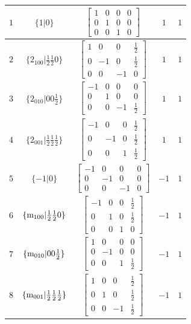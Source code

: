 \documentclass[fleqn,8pt]{jsarticle}
\begin{document}
\begin{longtable}{ccccc}
$ 1 $ & $ \{1|0\} $ & $ \begin{bmatrix} 1 & 0 & 0 & 0 \\ 0 & 1 & 0 & 0 \\ 0 & 0 & 1 & 0 \end{bmatrix} $ & $ 1 $ & $ 1 $ \\ \hline
$ 2 $ & $ \{2{}_{100}|\frac{1}{2} \frac{1}{2} 0\} $ & $ \begin{bmatrix} 1 & 0 & 0 & \frac{1}{2} \\ 0 & -1 & 0 & \frac{1}{2} \\ 0 & 0 & -1 & 0 \end{bmatrix} $ & $ 1 $ & $ 1 $ \\ \hline
$ 3 $ & $ \{2{}_{010}|0 0 \frac{1}{2}\} $ & $ \begin{bmatrix} -1 & 0 & 0 & 0 \\ 0 & 1 & 0 & 0 \\ 0 & 0 & -1 & \frac{1}{2} \end{bmatrix} $ & $ 1 $ & $ 1 $ \\ \hline
$ 4 $ & $ \{2{}_{001}|\frac{1}{2} \frac{1}{2} \frac{1}{2}\} $ & $ \begin{bmatrix} -1 & 0 & 0 & \frac{1}{2} \\ 0 & -1 & 0 & \frac{1}{2} \\ 0 & 0 & 1 & \frac{1}{2} \end{bmatrix} $ & $ 1 $ & $ 1 $ \\ \hline
$ 5 $ & $ \{-1|0\} $ & $ \begin{bmatrix} -1 & 0 & 0 & 0 \\ 0 & -1 & 0 & 0 \\ 0 & 0 & -1 & 0 \end{bmatrix} $ & $ -1 $ & $ 1 $ \\ \hline
$ 6 $ & $ \{{\rm m}_{100}|\frac{1}{2} \frac{1}{2} 0\} $ & $ \begin{bmatrix} -1 & 0 & 0 & \frac{1}{2} \\ 0 & 1 & 0 & \frac{1}{2} \\ 0 & 0 & 1 & 0 \end{bmatrix} $ & $ -1 $ & $ 1 $ \\ \hline
$ 7 $ & $ \{{\rm m}_{010}|0 0 \frac{1}{2}\} $ & $ \begin{bmatrix} 1 & 0 & 0 & 0 \\ 0 & -1 & 0 & 0 \\ 0 & 0 & 1 & \frac{1}{2} \end{bmatrix} $ & $ -1 $ & $ 1 $ \\ \hline
$ 8 $ & $ \{{\rm m}_{001}|\frac{1}{2} \frac{1}{2} \frac{1}{2}\} $ & $ \begin{bmatrix} 1 & 0 & 0 & \frac{1}{2} \\ 0 & 1 & 0 & \frac{1}{2} \\ 0 & 0 & -1 & \frac{1}{2} \end{bmatrix} $ & $ -1 $ & $ 1 $ \\ \hline

\end{longtable}
\end{document}
